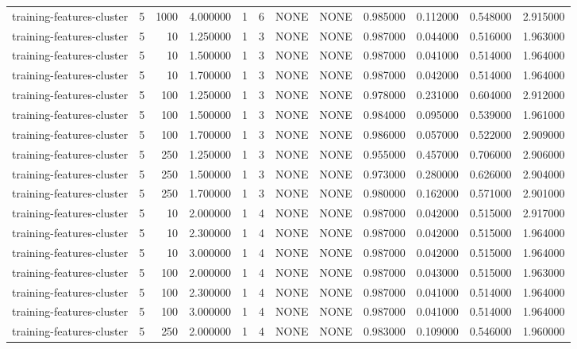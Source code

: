 \begin{tabular}{lrrrllllrrrr}
training-features-cluster & 5 & 1000 & 4.000000 & 1 & 6 & NONE & NONE & 0.985000 & 0.112000 & 0.548000 & 2.915000 \\
training-features-cluster & 5 & 10 & 1.250000 & 1 & 3 & NONE & NONE & 0.987000 & 0.044000 & 0.516000 & 1.963000 \\
training-features-cluster & 5 & 10 & 1.500000 & 1 & 3 & NONE & NONE & 0.987000 & 0.041000 & 0.514000 & 1.964000 \\
training-features-cluster & 5 & 10 & 1.700000 & 1 & 3 & NONE & NONE & 0.987000 & 0.042000 & 0.514000 & 1.964000 \\
training-features-cluster & 5 & 100 & 1.250000 & 1 & 3 & NONE & NONE & 0.978000 & 0.231000 & 0.604000 & 2.912000 \\
training-features-cluster & 5 & 100 & 1.500000 & 1 & 3 & NONE & NONE & 0.984000 & 0.095000 & 0.539000 & 1.961000 \\
training-features-cluster & 5 & 100 & 1.700000 & 1 & 3 & NONE & NONE & 0.986000 & 0.057000 & 0.522000 & 2.909000 \\
training-features-cluster & 5 & 250 & 1.250000 & 1 & 3 & NONE & NONE & 0.955000 & 0.457000 & 0.706000 & 2.906000 \\
training-features-cluster & 5 & 250 & 1.500000 & 1 & 3 & NONE & NONE & 0.973000 & 0.280000 & 0.626000 & 2.904000 \\
training-features-cluster & 5 & 250 & 1.700000 & 1 & 3 & NONE & NONE & 0.980000 & 0.162000 & 0.571000 & 2.901000 \\
training-features-cluster & 5 & 10 & 2.000000 & 1 & 4 & NONE & NONE & 0.987000 & 0.042000 & 0.515000 & 2.917000 \\
training-features-cluster & 5 & 10 & 2.300000 & 1 & 4 & NONE & NONE & 0.987000 & 0.042000 & 0.515000 & 1.964000 \\
training-features-cluster & 5 & 10 & 3.000000 & 1 & 4 & NONE & NONE & 0.987000 & 0.042000 & 0.515000 & 1.964000 \\
training-features-cluster & 5 & 100 & 2.000000 & 1 & 4 & NONE & NONE & 0.987000 & 0.043000 & 0.515000 & 1.963000 \\
training-features-cluster & 5 & 100 & 2.300000 & 1 & 4 & NONE & NONE & 0.987000 & 0.041000 & 0.514000 & 1.964000 \\
training-features-cluster & 5 & 100 & 3.000000 & 1 & 4 & NONE & NONE & 0.987000 & 0.041000 & 0.514000 & 1.964000 \\
training-features-cluster & 5 & 250 & 2.000000 & 1 & 4 & NONE & NONE & 0.983000 & 0.109000 & 0.546000 & 1.960000 \\

\end{tabular}
